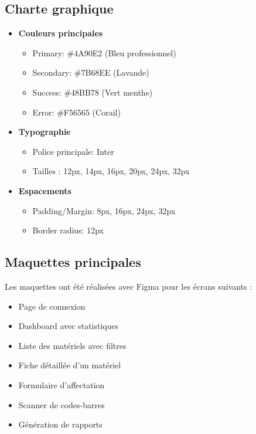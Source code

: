 \documentclass[12pt,a4paper]{report}
\begin{document}
\subsection{Charte graphique}

\begin{itemize}
    \item \textbf{Couleurs principales}
    \begin{itemize}
        \item Primary: \#4A90E2 (Bleu professionnel)
        \item Secondary: \#7B68EE (Lavande)
        \item Success: \#48BB78 (Vert menthe)
        \item Error: \#F56565 (Corail)
    \end{itemize}
    
    \item \textbf{Typographie}
    \begin{itemize}
        \item Police principale: Inter
        \item Tailles : 12px, 14px, 16px, 20px, 24px, 32px
    \end{itemize}
    
    \item \textbf{Espacements}
    \begin{itemize}
        \item Padding/Margin: 8px, 16px, 24px, 32px
        \item Border radius: 12px
    \end{itemize}
\end{itemize}

\subsection{Maquettes principales}

Les maquettes ont été réalisées avec Figma pour les écrans suivants :

\begin{itemize}
    \item Page de connexion
    \item Dashboard avec statistiques
    \item Liste des matériels avec filtres
    \item Fiche détaillée d'un matériel
    \item Formulaire d'affectation
    \item Scanner de codes-barres
    \item Génération de rapports
\end{itemize}
\end{document}

